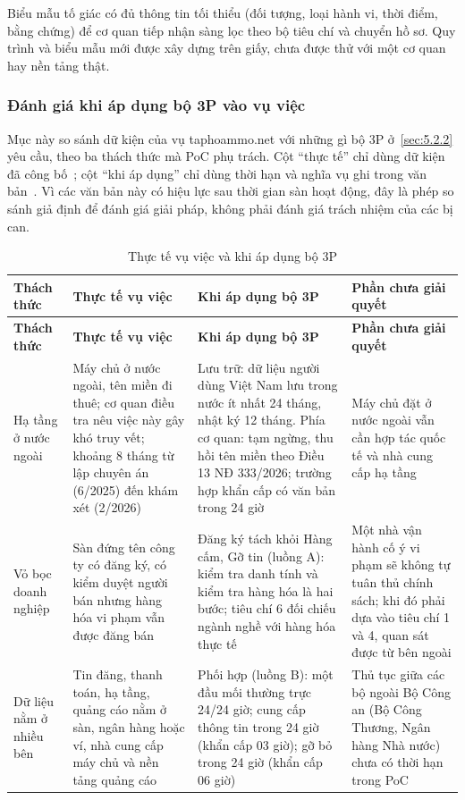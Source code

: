 Biểu mẫu tố giác có đủ thông tin tối thiểu (đối tượng, loại hành vi, thời điểm, bằng chứng) để cơ quan tiếp nhận sàng lọc theo bộ tiêu chí và chuyển hồ sơ. Quy trình và biểu mẫu mới được xây dựng trên giấy, chưa được thử với một cơ quan hay nền tảng thật.

\subsubsection{Đánh giá khi áp dụng bộ 3P vào vụ việc}\label{sec:6.1.3p}

Mục này so sánh dữ kiện của vụ taphoammo.net với những gì bộ 3P ở~\ref{sec:5.2.2} yêu cầu, theo ba thách thức mà PoC phụ trách. Cột “thực tế” chỉ dùng dữ kiện đã công bố~\cite{bca-2026,cand-2026}; cột “khi áp dụng” chỉ dùng thời hạn và nghĩa vụ ghi trong văn bản~\cite{luat-anm-2025,nd327-2026,nd333-2026}. Vì các văn bản này có hiệu lực sau thời gian sàn hoạt động, đây là phép so sánh giả định để đánh giá giải pháp, không phải đánh giá trách nhiệm của các bị can.

{\small{}
\begin{xltabular}{\textwidth}{>{\hsize\raggedright\arraybackslash}X>{\hsize\raggedright\arraybackslash}X>{\hsize\raggedright\arraybackslash}X>{\hsize\raggedright\arraybackslash}X}
\caption{Thực tế vụ việc và khi áp dụng bộ 3P}\label{tab:6.3p}\\
\toprule
\textbf{Thách thức} & \textbf{Thực tế vụ việc} & \textbf{Khi áp dụng bộ 3P} & \textbf{Phần chưa giải quyết} \\
\midrule
\endfirsthead
\toprule
\textbf{Thách thức} & \textbf{Thực tế vụ việc} & \textbf{Khi áp dụng bộ 3P} & \textbf{Phần chưa giải quyết} \\
\midrule
\endhead
\bottomrule
\endlastfoot
Hạ tầng ở nước ngoài & Máy chủ ở nước ngoài, tên miền đi thuê; cơ quan điều tra nêu việc này gây khó truy vết; khoảng 8 tháng từ lập chuyên án (6/2025) đến khám xét (2/2026) & Lưu trữ: dữ liệu người dùng Việt Nam lưu trong nước ít nhất 24 tháng, nhật ký 12 tháng. Phía cơ quan: tạm ngừng, thu hồi tên miền theo Điều 13 NĐ 333/2026; trường hợp khẩn cấp có văn bản trong 24 giờ & Máy chủ đặt ở nước ngoài vẫn cần hợp tác quốc tế và nhà cung cấp hạ tầng \\
Vỏ bọc doanh nghiệp & Sàn đứng tên công ty có đăng ký, có kiểm duyệt người bán nhưng hàng hóa vi phạm vẫn được đăng bán & Đăng ký tách khỏi Hàng cấm, Gỡ tin (luồng A): kiểm tra danh tính và kiểm tra hàng hóa là hai bước; tiêu chí 6 đối chiếu ngành nghề với hàng hóa thực tế & Một nhà vận hành cố ý vi phạm sẽ không tự tuân thủ chính sách; khi đó phải dựa vào tiêu chí 1 và 4, quan sát được từ bên ngoài \\
Dữ liệu nằm ở nhiều bên & Tin đăng, thanh toán, hạ tầng, quảng cáo nằm ở sàn, ngân hàng hoặc ví, nhà cung cấp máy chủ và nền tảng quảng cáo & Phối hợp (luồng B): một đầu mối thường trực 24/24 giờ; cung cấp thông tin trong 24 giờ (khẩn cấp 03 giờ); gỡ bỏ trong 24 giờ (khẩn cấp 06 giờ) & Thủ tục giữa các bộ ngoài Bộ Công an (Bộ Công Thương, Ngân hàng Nhà nước) chưa có thời hạn trong PoC \\
\end{xltabular}}

